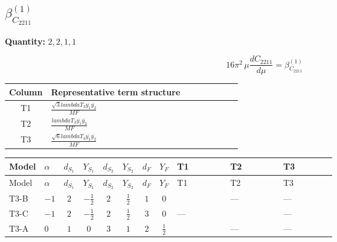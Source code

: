 \documentclass[8pt]{article}
\begin{document}
\begin{landscape}
\section*{$\beta_{C_{2211}}^{(1)}$}
\noindent\textbf{Quantity: }$\mathrm{2,2,1,1}$\par\smallskip
\[16\pi^2\,\mu\frac{d C_{2211}}{d\mu}=\beta_{C_{2211}}^{(1)}\]
\begin{center}
\begin{tabular}{@{}c >{\raggedright\arraybackslash}p{0.82\linewidth}@{}}
\toprule
Column & Representative term structure \\
\midrule
T1 & \(\displaystyle \frac{\sqrt{3} lambdaT_{3} \overline{y_{1}} \overline{y_{2}}}{MF}\) \\
\midrule
T2 & \(\displaystyle \frac{lambdaT_{3} \overline{y_{1}} \overline{y_{2}}}{MF}\) \\
\midrule
T3 & \(\displaystyle \frac{\sqrt{6} lambdaT_{3} \overline{y_{1}} \overline{y_{2}}}{MF}\) \\
\midrule
\bottomrule
\end{tabular}
\end{center}
\smallskip
\tiny
\begin{longtable}{@{}llcccccc >{\raggedright\arraybackslash}p{0.21\linewidth} >{\raggedright\arraybackslash}p{0.21\linewidth} >{\raggedright\arraybackslash}p{0.21\linewidth}@{}}
\toprule
Model & $\alpha$ & $d_{S_1}$ & $Y_{S_1}$ & $d_{S_2}$ & $Y_{S_2}$ & $d_F$ & $Y_F$ & T1 & T2 & T3 \\
\midrule
\endfirsthead
\toprule
Model & $\alpha$ & $d_{S_1}$ & $Y_{S_1}$ & $d_{S_2}$ & $Y_{S_2}$ & $d_F$ & $Y_F$ & T1 & T2 & T3 \\
\midrule
\endhead
T3-B & $-1$ & $2$ & $-\frac{1}{2}$ & $2$ & $\frac{1}{2}$ & $1$ & $0$ & \scriptsize\adjustbox{max width=\linewidth}{$\begin{gathered} \frac{2 \sqrt{3} lambdaT_{3} \overline{y_{1}} \overline{y_{2}}}{3 MF}\end{gathered}$} & --- & --- \\
\midrule
T3-C & $-1$ & $2$ & $-\frac{1}{2}$ & $2$ & $\frac{1}{2}$ & $3$ & $0$ & --- & \scriptsize\adjustbox{max width=\linewidth}{$\begin{gathered} - \frac{2 lambdaT_{3} \overline{y_{1}} \overline{y_{2}}}{3 MF}\end{gathered}$} & --- \\
\midrule
T3-A & $0$ & $1$ & $0$ & $3$ & $1$ & $2$ & $\frac{1}{2}$ & \scriptsize\adjustbox{max width=\linewidth}{$\begin{gathered} \frac{2 \sqrt{3} lambdaT_{3} \overline{y_{1}} \overline{y_{2}}}{3 MF}\end{gathered}$} & --- & --- \\

\end{longtable}
\end{landscape}
\end{document}
